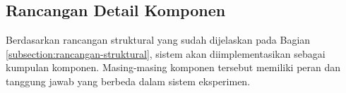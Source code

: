 \subsection{Rancangan Detail Komponen}
\label{subsection:detail-komponen}

Berdasarkan rancangan struktural yang sudah dijelaskan pada Bagian \ref{subsection:rancangan-struktural}, sistem akan diimplementasikan sebagai kumpulan komponen. Masing-masing komponen tersebut memiliki peran dan tanggung jawab yang berbeda dalam sistem eksperimen.










